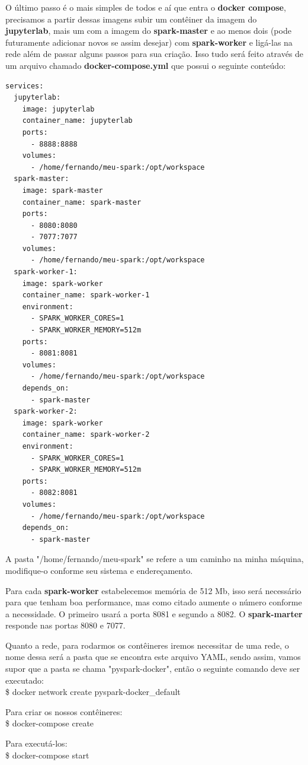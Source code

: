 O último passo é o mais simples de todos e aí que entra o \textbf{docker compose}, precisamos a partir dessas imagens subir um contêiner da imagem do \textbf{jupyterlab}, mais um com a imagem do \textbf{spark-master} e ao menos dois (pode futuramente adicionar novos se assim desejar) com \textbf{spark-worker} e ligá-las na rede além de passar alguns passos para sua criação. Isso tudo será feito através de um arquivo chamado \textbf{docker-compose.yml} que possui o seguinte conteúdo:
\begin{lstlisting}[]
services:
  jupyterlab:
    image: jupyterlab
    container_name: jupyterlab
    ports:
      - 8888:8888
    volumes:
      - /home/fernando/meu-spark:/opt/workspace
  spark-master:
    image: spark-master
    container_name: spark-master
    ports:
      - 8080:8080
      - 7077:7077
    volumes:
      - /home/fernando/meu-spark:/opt/workspace
  spark-worker-1:
    image: spark-worker
    container_name: spark-worker-1
    environment:
      - SPARK_WORKER_CORES=1
      - SPARK_WORKER_MEMORY=512m
    ports:
      - 8081:8081
    volumes:
      - /home/fernando/meu-spark:/opt/workspace
    depends_on:
      - spark-master
  spark-worker-2:
    image: spark-worker
    container_name: spark-worker-2
    environment:
      - SPARK_WORKER_CORES=1
      - SPARK_WORKER_MEMORY=512m
    ports:
      - 8082:8081
    volumes:
      - /home/fernando/meu-spark:/opt/workspace
    depends_on:
      - spark-master
\end{lstlisting}

A pasta "/home/fernando/meu-spark" se refere a um caminho na minha máquina, modifique-o conforme seu sistema e endereçamento.

Para cada \textbf{spark-worker} estabelecemos memória de 512 Mb, isso será necessário para que tenham boa performance, mas como citado aumente o número conforme a necessidade. O primeiro usará a porta 8081 e segundo a 8082. O \textbf{spark-marter} responde nas portas 8080 e 7077.

Quanto a rede, para rodarmos os contêineres iremos necessitar de uma rede, o nome dessa será a pasta que se encontra este arquivo YAML, sendo assim, vamos supor que a pasta se chama "pyspark-docker", então o seguinte comando deve ser executado: \\
{\ttfamily\$ docker network create pyspark-docker\_default}

Para criar os nossos contêineres: \\
{\ttfamily\$ docker-compose create}

Para executá-los: \\
{\ttfamily\$ docker-compose start}

